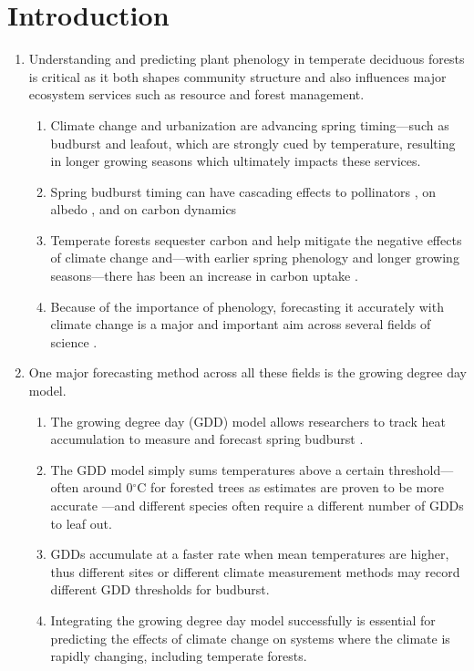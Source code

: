 \documentclass{article}\usepackage[]{graphicx}\usepackage[]{color}
\begin{document}
\section*{Introduction}
\begin{enumerate}
\item Understanding and predicting plant phenology in temperate deciduous forests is critical as it both shapes community structure and also influences major ecosystem services such as resource and forest management. 
  \begin{enumerate} 
  \item Climate change and urbanization are advancing spring timing---such as budburst and leafout, which  are strongly cued by temperature, resulting in longer growing seasons \citep{Chuine2001} which ultimately impacts these services.  
  \item   Spring budburst timing can have cascading effects to pollinators \citep{Boggs2012, Pardee2017}, on albedo \citep{Williamson2016}, and on carbon dynamics \citep{Richardson2013} 
  \item Temperate forests sequester carbon and help mitigate the negative effects of climate change and---with earlier spring phenology and longer growing seasons---there has been an increase in carbon uptake \citep{Keenan2014}.
  \item Because of the importance of phenology, forecasting it accurately with climate change is a major and important aim across several fields of science \citep{Moorcroft2001,Taylor2020,Yu2016,Zhao2012}.
  \end{enumerate}
  
\item One major forecasting method across all these fields is the growing degree day model. 
  \begin{enumerate} 
   \item The growing degree day (GDD) model allows researchers to track heat accumulation to measure and forecast spring budburst \citep{Cook2012,Crimmins2020,Phillimore2013,Schwartz2006,Vitasse2011}.
  \item The GDD model simply sums temperatures above a certain threshold---often around 0$^{\circ}$C for forested trees as estimates are proven to be more accurate \citep{Man2010}---and different species often require a different number of GDDs to leaf out. 
  \item GDDs accumulate at a faster rate when mean temperatures are higher, thus different sites or different climate measurement methods may record different GDD thresholds for budburst. 
  \item  Integrating the growing degree day model successfully is essential for predicting the effects of climate change on systems where the climate is rapidly changing, including temperate forests. 
  \end{enumerate}
  

\end{enumerate}
\end{document}
